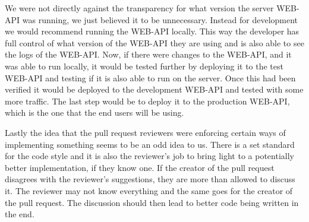 We were not directly against the transparency for what version the server WEB-API was running, we just believed it to be unnecessary.
Instead for development we would recommend running the WEB-API locally.
This way the developer has full control of what version of the WEB-API they are using and is also able to see the logs of the WEB-API.
Now, if there were changes to the WEB-API, and it was able to run locally, it would be tested further by deploying it to the test WEB-API and testing if it is also able to run on the server.
Once this had been verified it would be deployed to the development WEB-API and tested with some more traffic.
The last step would be to deploy it to the production WEB-API, which is the one that the end users will be using.

Lastly the idea that the pull request reviewers were enforcing certain ways of implementing something seems to be an odd idea to us.
There is a set standard for the code style and it is also the reviewer's job to bring light to a potentially better implementation, if they know one.
If the creator of the pull request disagrees with the reviewer's suggestions, they are more than allowed to discuss it. 
The reviewer may not know everything and the same goes for the creator of the pull request.
The discussion should then lead to better code being written in the end.
